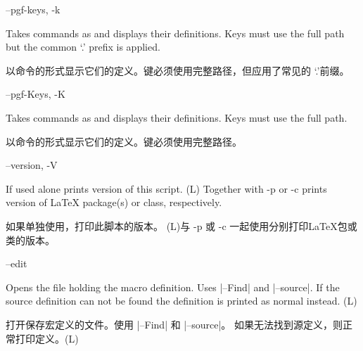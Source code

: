 \documentclass{article}
\newenvironment{options}{%
    \def\cstart{\begingroup\ttfamily\par\noindent\ignorespaces}%
    \def\csep{\endgroup\begingroup\list {}{}\item \relax}%
    \def\cend{\endlist\par\medskip\endgroup\cstart}%
    \cstart
}{%
    \endgroup
}
\begin{document}
\begin{options}
--pgf-keys, -k                                     \csep 
Takes commands as  and displays their definitions. Keys must use the full path but the common `.\@cmd' prefix is applied.

以命令的形式显示它们的定义。键必须使用完整路径，但应用了常见的 `.\@cmd'前缀。
\cend
\end{options}

\begin{options}
--pgf-Keys, -K                                     \csep 
Takes commands as  and displays their definitions. Keys must use the full path.

以命令的形式显示它们的定义。键必须使用完整路径。
\cend
\end{options}

\begin{options}
--version, -V                                      \csep 
If used alone prints version of this script.
(L) Together with -p or -c prints version of LaTeX package(s) or class, respectively.

如果单独使用，打印此脚本的版本。 (L)与 -p 或 -c 一起使用分别打印LaTeX包或类的版本。
\cend
\end{options}

\begin{options}
--edit                                             \csep 
Opens the file holding the macro definition. Uses |--Find| and |--source|.
If the source definition can not be found the definition is printed as normal instead. (L)

打开保存宏定义的文件。使用 |--Find| 和 |--source|。 如果无法找到源定义，则正常打印定义。(L)
\cend
\end{options}
\end{document}
